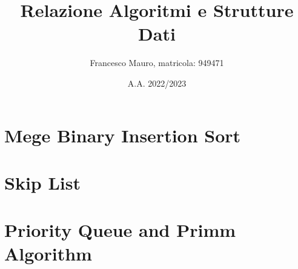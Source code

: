 \documentclass[letterpaper]{report}
\title{Relazione Algoritmi e Strutture Dati}
\author{Francesco Mauro, matricola: 949471}
\date{A.A. 2022/2023}
\begin{document}
\maketitle
\tableofcontents
\newpage
\chapter{Mege Binary Insertion Sort}

\chapter{Skip List}


\chapter{Priority Queue and Primm Algorithm}
\end{document}
